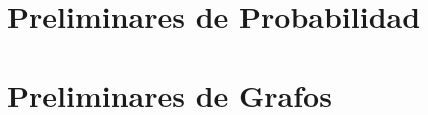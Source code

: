 %
%
%
%
%
%






\section{Preliminares de Probabilidad}






%
%
%
%
%
%




\section{Preliminares de Grafos}

